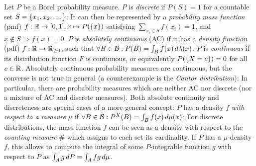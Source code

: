 \documentclass[a4paper]{scrreprt}
\newcommand{\Rp}{\mathbb{R}_{\geq 0}}
\newcommand{\B}{\mathcal{B}}
\theoremstyle{definition}
\begin{document}
    
    Let $P$ be a Borel probability measure.
    $P$ is \emph{discrete} if $P(S) = 1$ for a countable set $S = \{x_1, x_2, \dots\}$: It can then be represented by a \emph{probability mass function} (pmf) $f: \mathbb{R} \to [0, 1], x \mapsto P(\{x\})$ satisfying $\sum_{x_i \in S} f(x_i) = 1$, and $x \notin S \Rightarrow f(x) = 0$.
    $P$ is \emph{absolutely continuous} (AC) if it has a \emph{density function} (pdf) $f: \R \to \Rp$, such that $\forall B \in \B: P(B) = \lintegral{B}{f(x)}{\lambda(x)}$.
    $P$ is \emph{continuous} if its distribution function $F$ is continuous, or equivalently $P(\{X = c\}) = 0$ for all $c \in \mathbb{R}$.
    Absolutely continuous probability measures are continuous, but the converse is not true in general (a counterexample is the \emph{Cantor distribution}): In particular, there are probability measures which are neither AC nor discrete (nor a mixture of AC and discrete measures).
    Both absolute continuity and discreteness are special cases of a more general concept: $P$ has a density $f$ \emph{with respect to a measure $\mu$} if $\forall B \in \B: P^X(B) = \lintegral{B}{f(x)}{\mu(x)}$; For discrete distributions, the mass function $f$ can be seen as a density with respect to the \emph{counting measure} $\#$ which assigns to each set its cardinality.
    If $P$ has a $\mu$-density $f$, this allows to compute the integral of some $P$-integrable function $g$ with respect to $P$ as $\int_{A} g \, dP = \int_{A} f g \, d\mu$.
    
\end{document}
